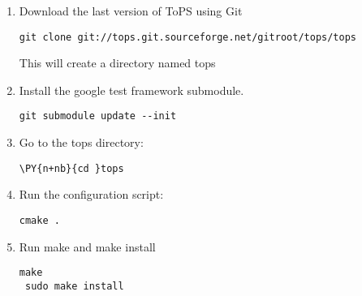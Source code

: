 \begin{enumerate}
\item Download the last version of ToPS using Git

\begin{Verbatim}[commandchars=\\\{\}]
 git clone git://tops.git.sourceforge.net/gitroot/tops/tops 
\end{Verbatim}

 This will create a directory named tops

\item Install the google test framework submodule.

\begin{Verbatim}[commandchars=\\\{\}]
 git submodule update --init 
\end{Verbatim}


\item Go to the tops directory:

\begin{Verbatim}[commandchars=\\\{\}]
 \PY{n+nb}{cd }tops 
\end{Verbatim}

\item Run the configuration script:

\begin{Verbatim}[commandchars=\\\{\}]
cmake .
\end{Verbatim}

\item Run make and make install

\begin{Verbatim}[commandchars=\\\{\}]
 make 
 sudo make install 
\end{Verbatim}

\end{enumerate}

